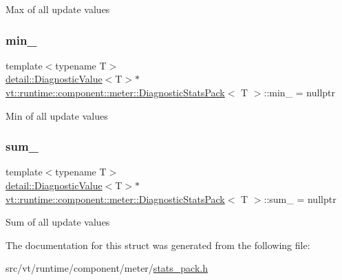 Max of all update values \mbox{\label{structvt_1_1runtime_1_1component_1_1meter_1_1_diagnostic_stats_pack_a207533d7500f7a6e2714da73c254e6a4}} 
\subsubsection{\texorpdfstring{min\+\_\+}{min\_}}
{\footnotesize\ttfamily template$<$typename T$>$ \\
\hyperlink{structvt_1_1runtime_1_1component_1_1detail_1_1_diagnostic_value}{detail\+::\+Diagnostic\+Value}$<$T$>$$\ast$ \hyperlink{structvt_1_1runtime_1_1component_1_1meter_1_1_diagnostic_stats_pack}{vt\+::runtime\+::component\+::meter\+::\+Diagnostic\+Stats\+Pack}$<$ T $>$\+::min\+\_\+ = nullptr\hspace{0.3cm}{\ttfamily [protected]}}

Min of all update values \mbox{\label{structvt_1_1runtime_1_1component_1_1meter_1_1_diagnostic_stats_pack_a28c6bb74f1f0ab30e2211c3398942eea}} 
\subsubsection{\texorpdfstring{sum\+\_\+}{sum\_}}
{\footnotesize\ttfamily template$<$typename T$>$ \\
\hyperlink{structvt_1_1runtime_1_1component_1_1detail_1_1_diagnostic_value}{detail\+::\+Diagnostic\+Value}$<$T$>$$\ast$ \hyperlink{structvt_1_1runtime_1_1component_1_1meter_1_1_diagnostic_stats_pack}{vt\+::runtime\+::component\+::meter\+::\+Diagnostic\+Stats\+Pack}$<$ T $>$\+::sum\+\_\+ = nullptr\hspace{0.3cm}{\ttfamily [protected]}}

Sum of all update values 

The documentation for this struct was generated from the following file\+:\begin{DoxyCompactItemize}
\item 
src/vt/runtime/component/meter/\hyperlink{stats__pack_8h}{stats\+\_\+pack.\+h}\end{DoxyCompactItemize}
